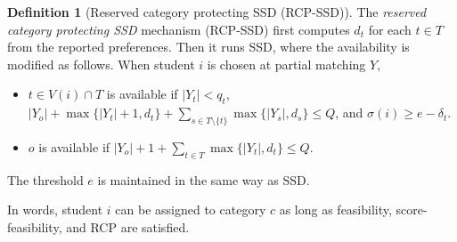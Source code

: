 \documentclass[a4paper,twoside]{article}
\theoremstyle{definition}
\newtheorem{definition}{Definition}
\begin{document}
\begin{definition}[Reserved category protecting SSD (RCP-SSD)]
\label{def:rcpssd}
The \emph{reserved category protecting SSD} mechanism (RCP-SSD) first computes $d_t$ for each $t\in T$ from the reported preferences.
Then it runs SSD, where the availability is modified as follows.
When student $i$ is chosen at partial matching $Y$, 
\begin{itemize}
    \item $t\in V(i)\cap T$ is available 
if $|Y_t|< q_t$, $|Y_o| + \max\{|Y_t|+1, d_t\} + \sum_{s \in T\setminus\{t\}}\max\{|Y_s|, d_s\}\leq Q$, 
and $\sigma(i)\ge e-\delta_t$. 
\item $o$ is available 
if $|Y_o|+1 + \sum_{t \in T}\max\{|Y_t|, d_t\}\leq Q$.
\end{itemize}
The threshold $e$ is maintained in the same way as SSD.
\end{definition}
In words, student $i$ can be assigned to category $c$ as long as feasibility, score-feasibility, and RCP are satisfied. 
\end{document}
